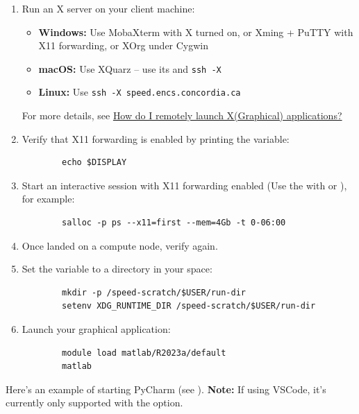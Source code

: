 \begin{enumerate}
	\item Run an X server on your client machine:
	\begin{itemize}
		\item \textbf{Windows:} Use MobaXterm with X turned on, or Xming + PuTTY with X11 forwarding, or XOrg under Cygwin
		\item \textbf{macOS:} Use XQuarz -- use its  and \texttt{ssh -X}
		\item \textbf{Linux:} Use \texttt{ssh -X speed.encs.concordia.ca}
	\end{itemize}
	For more details, see \href{https://www.concordia.ca/ginacody/aits/support/faq/xserver.html}{How do I remotely launch X(Graphical) applications?}

	\item Verify that X11 forwarding is enabled by printing the  variable:
	\begin{verbatim}
		echo $DISPLAY
	\end{verbatim}

	\item Start an interactive session with X11 forwarding enabled (Use the  with  or ), for example:
	\begin{verbatim}
		salloc -p ps --x11=first --mem=4Gb -t 0-06:00
	\end{verbatim}

	\item Once landed on a compute node, verify  again.
	
	\item Set the  variable to a directory in your  space:
	\begin{verbatim}
		mkdir -p /speed-scratch/$USER/run-dir
		setenv XDG_RUNTIME_DIR /speed-scratch/$USER/run-dir
	\end{verbatim}
	
	\item Launch your graphical application:
	\begin{verbatim}
		module load matlab/R2023a/default 
		matlab
	\end{verbatim}
\end{enumerate}

\noindent Here's an example of starting PyCharm (see ). 
\textbf{Note:} If using VSCode, it's currently only supported with the  option.\\

